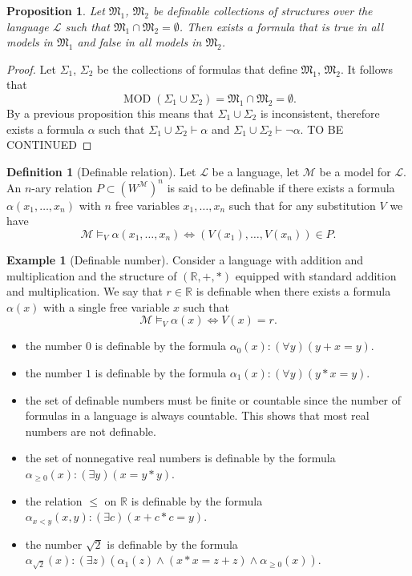 \documentclass[11pt,a4paper]{article}
\theoremstyle{definition}
\newtheorem{definition}{Definition}[section]
\newtheorem{example}{Example}[section]
\theoremstyle{plain}
\newtheorem{proposition}[theorem]{Proposition}
\DeclareMathOperator{\MOD}{MOD}
\newcommand{\R}{\mathbb{R}}
\newcommand{\M}{\mathcal{M}}
\renewcommand{\L}{\mathcal{L}}
\begin{document}
  \begin{proposition}
    Let $\mathfrak M_1$, $\mathfrak M_2$ be definable collections of structures
    over the language $\L$ such that 
    $\mathfrak M_1 \cap \mathfrak M_2 = \emptyset$.
    Then exists a formula that is true in all models in $\mathfrak M_1$
    and false in all models in $\mathfrak M_2$.
  \end{proposition}
  \begin{proof}
    Let $\Sigma_1$, $\Sigma_2$ be the collections of formulas that define
    $\mathfrak M_1$, $\mathfrak M_2$.
    It follows that
    \[
      \MOD(\Sigma_1 \cup \Sigma_2) =
      \mathfrak M_1 \cap \mathfrak M_2 =
      \emptyset.
    \]
    By a previous proposition this means that $\Sigma_1 \cup \Sigma_2$ is
    inconsistent, therefore exists a formula $\alpha$ such that
    $\Sigma_1 \cup \Sigma_2 \vdash \alpha$ and
    $\Sigma_1 \cup \Sigma_2 \vdash \neg \alpha$.
    TO BE CONTINUED
  \end{proof}

  \begin{definition}[Definable relation]
    Let $\L$ be a language, let $\M$ be a model for $\L$.
    An $n$-ary relation $P \subset (W^\M)^n$ is said to be definable if there
    exists a formula $\alpha(x_1,\dots,x_n)$ with $n$ free variables 
    $x_1,\dots,x_n$ such that for any substitution $V$ we have
    \[
      \M \models_V \alpha(x_1,\dots,x_n) \iff
      (V(x_1),\dots,V(x_n)) \in P.
    \]
  \end{definition}

  \begin{example}[Definable number]
    Consider a language with addition and multiplication and the structure
    of $(\R,+,*)$ equipped with standard addition and multiplication.
    We say that $r \in \R$ is definable when there exists a formula
    $\alpha(x)$ with a single free variable $x$ such that
    \[
      \M \models_V \alpha(x) \iff
      V(x) = r.
    \]
  \end{example}

  \begin{itemize}
    \item the number $0$ is definable by the formula 
      $\alpha_0(x) \colon (\forall y)(y + x = y)$.
    \item the number $1$ is definable by the formula
      $\alpha_1(x) \colon (\forall y)(y * x = y)$.
    \item the set of definable numbers must be finite or countable since the
      number of formulas in a language is always countable.
      This shows that most real numbers are not definable.
    \item the set of nonnegative real numbers is definable by the formula
      $\alpha_{\geq 0}(x) \colon (\exists y)(x = y * y)$.
    \item the relation $\le$ on $\R$ is definable by the formula
      $\alpha_{x < y}(x,y) \colon (\exists c)(x + c * c = y)$.
    \item the number $\sqrt{2}$ is definable by the formula
      $\alpha_{\sqrt 2}(x) \colon (\exists z)(\alpha_1(z) \land (x * x = z + z)
      \land \alpha_{\geq 0}(x))$.
  \end{itemize}
\end{document}
